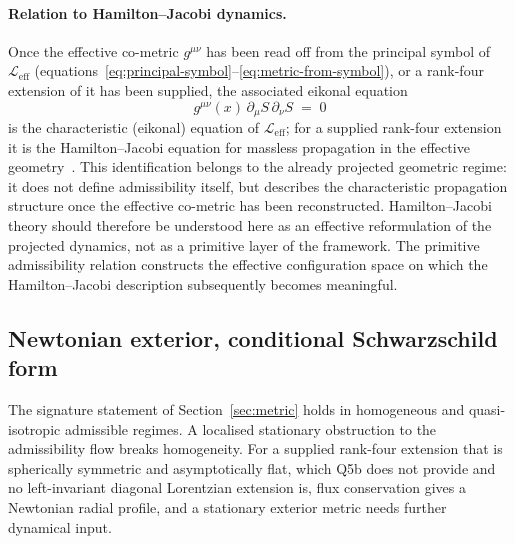 \documentclass[11pt,a4paper]{article}
\begin{document}
    \paragraph{Relation to Hamilton--Jacobi dynamics.}
      Once the effective co-metric $g^{\mu\nu}$ has been read off from the principal symbol of
      $\mathcal{L}_{\mathrm{eff}}$ (equations~\eqref{eq:principal-symbol}--\eqref{eq:metric-from-symbol}), or a
      rank-four extension of it has been supplied,
      the associated eikonal equation
      \[
        g^{\mu\nu}(x)\,\partial_\mu S\,\partial_\nu S \;=\; 0
      \]
      is the characteristic (eikonal) equation of $\mathcal{L}_{\mathrm{eff}}$; for a supplied rank-four extension it
      is the Hamilton--Jacobi equation for massless propagation in the effective geometry~\cite{Arnold1989}.
      This identification belongs to the already projected geometric regime: it does not define admissibility
      itself, but describes the characteristic propagation structure once the effective co-metric has been
      reconstructed.
      Hamilton--Jacobi theory should therefore be understood here as an effective reformulation of the
      projected dynamics, not as a primitive layer of the framework.
      The primitive admissibility relation constructs the effective configuration space on which the
      Hamilton--Jacobi description subsequently becomes meaningful.

  \subsection{Newtonian exterior, conditional Schwarzschild form}
  \label{sec:schwarzschild}

  The signature statement of Section~\ref{sec:metric} holds in homogeneous and quasi-isotropic admissible
  regimes.
  A localised stationary obstruction to the admissibility flow breaks homogeneity.
  For a supplied rank-four extension that is spherically symmetric and asymptotically flat, which Q5b does not provide
  and no left-invariant diagonal Lorentzian extension is, flux conservation gives a Newtonian radial profile, and a
  stationary exterior metric needs further dynamical input.
\end{document}
